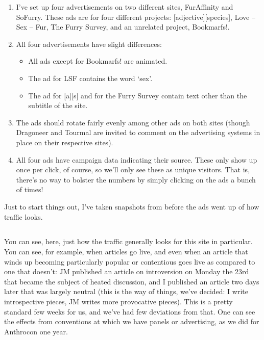 \begin{enumerate}
  \item I've set up four advertisements on two different sites, FurAffinity and SoFurry. These ads are for four different projects: [adjective][species], Love -- Sex -- Fur, The Furry Survey, and an unrelated project, Bookmarfs!.
  \item All four advertisements have slight differences:

  \begin{itemize}
    \item All ads except for Bookmarfs! are animated.
    \item The ad for LSF contains the word `sex'.
    \item The ad for [a][s] and for the Furry Survey contain text other than the subtitle of the site.
  \end{itemize}

  \item The ads should rotate fairly evenly among other ads on both sites (though Dragoneer and Tourmal are invited to comment on the advertising systems in place on their respective sites).
  \item All four ads have campaign data indicating their source. These only show up once per click, of course, so we'll only see these as unique visitors. That is, there's no way to bolster the numbers by simply clicking on the ads a bunch of times!
\end{enumerate}

Just to start things out, I've taken snapshots from before the ads went up of how traffic looks.

\subsection*{\adjsp}

You can see, here, just how the traffic generally looks for this site in particular. You can see, for example, when articles go live, and even when an article that winds up becoming particularly popular or contentious goes live as compared to one that doesn't: JM published an article on introversion on Monday the 23rd that became the subject of heated discussion, and I published an article two days later that was largely neutral (this is the way of things, we've decided: I write introspective pieces, JM writes more provocative pieces). This is a pretty standard few weeks for us, and we've had few deviations from that. One can see the effects from conventions at which we have panels or advertising, as we did for Anthrocon one year.

